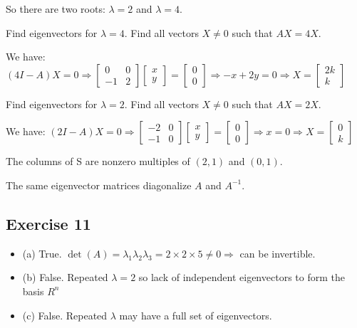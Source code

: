 \documentclass{article}
\begin{document}
So there are two roots:
$\lambda = 2$ and $\lambda = 4$.

Find eigenvectors for $\lambda = 4$. Find all vectors $X \neq 0$ such that $AX = 4X$.

We have:
$(4I - A) X = 0 \Rightarrow
    \begin{bmatrix}
        0 & 0 \\
        -1 & 2
    \end{bmatrix}
    \begin{bmatrix}
        x \\
        y
    \end{bmatrix} = \begin{bmatrix}
        0 \\
        0
    \end{bmatrix}
    \Rightarrow -x + 2y = 0
    \Rightarrow X = \begin{bmatrix}
        2k \\
        k
    \end{bmatrix}$


Find eigenvectors for $\lambda = 2$. Find all vectors $X \neq 0$ such that $AX = 2X$.

We have:
$(2I - A) X = 0 \Rightarrow
    \begin{bmatrix}
        -2 & 0 \\
        -1 & 0
    \end{bmatrix}
    \begin{bmatrix}
        x \\
        y
    \end{bmatrix} = \begin{bmatrix}
        0 \\
        0
    \end{bmatrix}
    \Rightarrow x = 0
    \Rightarrow X = \begin{bmatrix}
        0 \\
        k
    \end{bmatrix}$

The columns of S are nonzero multiples of $(2, 1)$ and $(0, 1)$.

The same eigenvector matrices diagonalize $A$ and $A^{-1}$.

\subsection{Exercise 11}
\begin{itemize}
    \item (a) True. $\det(A) = \lambda_1 \lambda_2 \lambda_3 = 2 \times 2 \times 5 \neq 0 \Rightarrow$ can be invertible.
    \item (b) False. Repeated $\lambda = 2$ so lack of independent eigenvectors to form the basis $R^n$
    \item (c) False. Repeated $\lambda$ may have a full set of eigenvectors.
\end{itemize}
\end{document}
